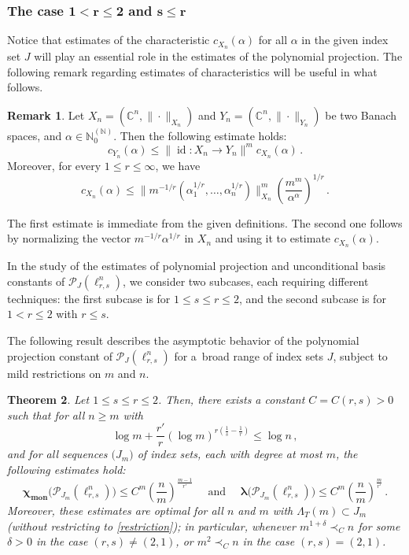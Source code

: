 \documentclass[12pt]{amsart}
\numberwithin{subsection}{section}
\newtheorem{theorem}{Theorem}[section]
\theoremstyle{definition}
\newtheorem{remark}[theorem]{Remark}
\theoremstyle{remark}
\DeclareMathOperator{\mon}{mon}
\DeclareMathOperator{\id}{\mathrm{id}}
\newcommand{\chimon}{\chi_{\mon}}
\begin{document}
\subsubsection{\bf The case $\pmb{1 < r  \le 2}$ and $\pmb{s\leq r}$}
\label{firstcase}

Notice that estimates of the characteristic  $c_{X_n}(\alpha)$ for all $\alpha$ in the given index set $J$ will play an essential
role in the estimates of the polynomial projection. The following remark regarding estimates of characteristics will be useful
in what follows.

\begin{remark} \label{verysimple}
Let $X_n = (\mathbb{C}^n,\|\cdot\|_{X_n})$ and $Y_n = (\mathbb{C}^n,\|\cdot\|_{Y_n})$ be two Banach spaces,
and  $\alpha \in \mathbb{N}_0^{(\mathbb{N})}$. Then the following estimate holds{\rm:}
\[
c_{Y_n}(\alpha) \leq \|\id \colon X_n  \to Y_n \|^m c_{X_n}(\alpha)\,.
\]
Moreover, for every $1 \leq r \leq \infty$, we have
\[
c_{X_n}(\alpha) \le \big\|m^{-1/r}(\alpha_1^{1/r},\dots,\alpha_n^{1/r})\big\|^m_{X_n} \left( \frac{m^{m}}{\alpha^\alpha} \right)^{1/r}\,.
\]
\end{remark}

The first estimate is immediate from the given definitions. The second one follows by normalizing the vector $m^{-1/r}\alpha^{1/r}$
in $X_n$ and using  it to estimate $c_{X_n}(\alpha)$.


In the study of the estimates of polynomial projection and unconditional basis constants of $\mathcal{P}_J(\ell_{r,s}^n)$, we consider
two subcases,  each requiring different techniques: the first subcase is for $1 \leq s \leq r \leq 2$, and the second subcase is for
$1 < r \leq 2$ with $r \leq s$.



The following result describes the asymptotic behavior of the polynomial projection constant of $\mathcal P_{J}(\ell_{r,s}^n)$ for
a~broad range of index sets $J$, subject to mild restrictions on $m$ and $n$.


\begin{theorem} \label{bound_similar_ell_r}
Let $1\le s \le r\le 2$. Then, there exists a constant $C=C(r, s)>0$ such that 
for all $n\geq m$ with
\begin{equation}\label{restriction}
\log m + \frac{r'}{r}(\log m)^{r(\frac1{s}-\frac1{r})} \le  \log n\,,
\end{equation}
and for all
sequences $\big(J_m\big)$ of index sets,
each with degree at most $m$, 
the following estimates hold{\rm:}
\[
\boldsymbol{\chimon}\big(\mathcal P_{J_m}( \ell_{r,s}^n)\big) \le C^m  \left(\frac{n}{m} \right)^{\frac{m-1}{r'}}
\,\,\quad \text{and}\,\,\quad
 \boldsymbol{\lambda}\big(\mathcal P_{J_m}(\ell_{r,s}^n)\big) \le C^m   \left(\frac{n}{m} \right)^{\frac{m}{r'}}\,.
\]
Moreover,  these estimates  are  optimal for all $n$ and $m$ with $\Lambda_T(m) \subset J_m$
(without restricting to \eqref{restriction}); in particular,  whenever   $m^{1+\delta} \prec_C n$ for some $\delta>0$ in the case
$(r,s)\ne(2,1)$, or $m^{2} \prec_C n$ in the case $(r,s)=(2,1)$.
\end{theorem}
\end{document}

